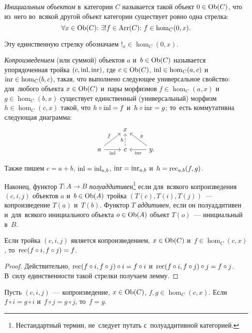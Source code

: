 \documentclass[a4paper,oneside]{article}
\begin{document}
\textit{Инициальным объектом} в~категории $C$ называется такой объект $0 \in \mathrm{Ob}(C)$,
что из~него во~всякой другой объект категории существует ровно одна стрелка:
$$
  \forall x \in \mathrm{Ob}(C){:}\ \exists! f \in \mathrm{Arr}(C){:}\ f \in \hom_C(0, x).
$$

Эту единственную стрелку обозначаем $!_x \in \hom_C(0, x)$.

\textit{Копроизведением} (или суммой) объектов $a$ и~$b \in \mathrm{Ob}(C)$ называется упорядоченная тройка $(c, \mathrm{inl}, \mathrm{inr})$,
где $c \in \mathrm{Ob}(C)$, $\mathrm{inl} \in \hom_C(a, c)$ и~$\mathrm{inr} \in \hom_C(b, c)$, такая, что
выполнено следующее универсальное свойство: для~любого объекта $x \in \mathrm{Ob}(C)$ и~пары морфизмов $f \in \hom_C(a, x)$
и~$g \in \hom_C(b, x)$ существует единственный (универсальный) морфизм $h \in \hom_C(c, x)$ такой, что $h \circ \mathrm{inl} = f$
и~$h \circ \mathrm{inr} = g$; то~есть коммутативна следующая диаграмма:
\[
    \begin{tikzcd}
        & x & \\ a \arrow{r}{}[swap]{\inl} \arrow{ur}{f} & \arrow[dashed]{u}{h} c & \arrow{l}{\inr}[swap]{} \arrow{ul}{}[swap]{g} y.
    \end{tikzcd}
\]

Также пишем $c = a + b$, $\mathrm{inl} = \mathrm{inl}_{a, b}$, $\mathrm{inr} = \mathrm{inr}_{a, b}$
и~$h = \mathrm{rec}_{a, b}(f, g)$.

Наконец, функтор $T : A \rightarrow B$ \textit{полуаддитивен}\rlap{\textit{,}}\footnote{
    Нестандартный термин, не~следует путать с~полуаддитивной категорией.
} если для~всякого копроизведения $(c, i, j)$ объектов $a$ и~$b \in \mathrm{Ob}(A)$
тройка $(T(c), T(i), T(j))$~— копроизведение $T(a)$ и~$T(b)$. Функтор $T$ \textit{аддитивен,} если он полуаддитивен и~для~всякого инициального объекта
$o \in \mathrm{Ob}(A)$ объект $T(o)$~— инициальный в~$B$.

\begin{lemma*}
    Если тройка $(c, i, j)$ является копроизведением, $x \in \mathrm{Ob}(C)$
    и~$f \in \hom_C(c,\allowbreak x)$, то~$\mathrm{rec}(f \circ i, f \circ j) = f$.
\end{lemma*}

\begin{proof}
    Действительно, $\mathrm{rec}(f \circ i, f \circ j) \circ i = f \circ i$
    и~$\mathrm{rec}(f \circ i, f \circ j) \circ j = f \circ j$.
    В~силу единственности такой стрелки получаем лемму.
\end{proof}

\begin{lemma*}
    Пусть $(c, i, j)$~— копроизведение, $x \in \mathrm{Ob}(C)$, $f, g \in \hom_C(c, x)$.
    Если $f \circ i = g \circ i$ и~$f \circ j = g \circ j$, то~$f = g$.
\end{lemma*}
\end{document}
